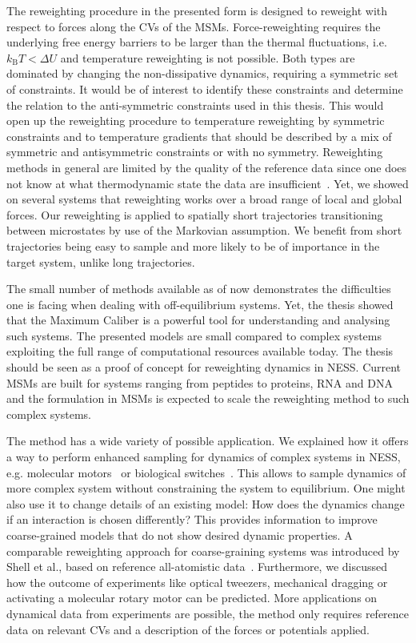 \documentclass[12pt]{report}
\begin{document}
The reweighting procedure in the presented form is designed to reweight with respect to forces along the CVs of the MSMs. Force-reweighting requires the underlying free energy barriers to be larger than the thermal fluctuations, i.e. $k_{\mathrm{B}} T < \Delta U$ and temperature reweighting is not possible.  Both types are  dominated by changing the non-dissipative dynamics, requiring a symmetric set of constraints. It would be of interest to identify these constraints and determine the relation to the anti-symmetric constraints used in this thesis. This would open up the reweighting procedure to temperature reweighting by symmetric constraints and to temperature gradients that should be described by a mix of symmetric and antisymmetric constraints or with no symmetry.  Reweighting methods in general are limited by the quality of the reference data since one does not know at what thermodynamic state the data are insufficient~\cite{warren2018trajectory}. Yet, we showed on several systems that reweighting works over a broad range of local and global forces. Our reweighting is applied to spatially short trajectories transitioning between microstates by use of the Markovian assumption. We benefit from short trajectories being easy to sample and more likely to be of importance in the target system, unlike long trajectories.

The small number of methods available as of now demonstrates the difficulties one is facing when dealing with off-equilibrium systems. Yet, the thesis showed that the Maximum Caliber is a powerful tool for understanding and analysing such systems. The presented models are small compared to complex systems exploiting the full range of computational resources available today. The thesis should be seen as a proof of concept for reweighting dynamics in NESS. Current MSMs are built for systems ranging from peptides to proteins, RNA and DNA~\cite{schutte2015critical} and the formulation in MSMs is expected to scale the reweighting method to such complex systems.
 
The method has a wide variety of possible application. We explained how it offers a way to perform enhanced sampling for dynamics of complex systems in NESS, e.g. molecular motors~\cite{schliwa2003molecular} or biological switches~\cite{goldbeter1997biochemical}. This allows to sample dynamics of more complex system without constraining the system to equilibrium. One might also use it to change details of an existing model: How does the dynamics change if an interaction is chosen differently? This provides information to improve coarse-grained models that do not show desired dynamic properties.  A comparable reweighting approach for coarse-graining systems was introduced by Shell et al., based on reference all-atomistic data~\cite{chaimovich2010relative}.  Furthermore, we discussed how the outcome of experiments like optical tweezers, mechanical dragging or activating a molecular rotary motor can be predicted. More applications on dynamical data from experiments are possible, the method only requires reference data on relevant CVs and a description of the forces or potentials applied. 

 


\end{document}
